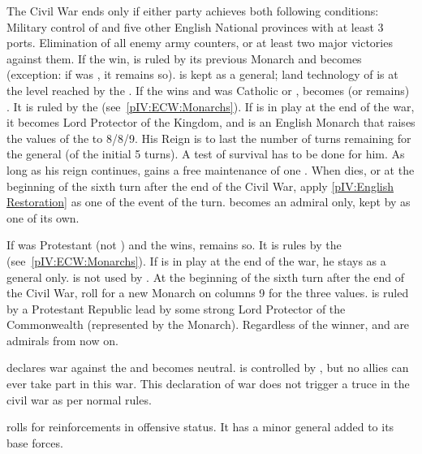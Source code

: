 \phpaix
\aparag The Civil War ends only if either party achieves both following
conditions:
\bparag Military control of  and five other English
National provinces with at least 3 ports.
\bparag Elimination of all enemy army counters, or at least two major
victories against them.
\aparag If the \royal win, \ENG is ruled by its previous Monarch and becomes
\CATHCR (exception: if \ENG was \CATHCO, it remains so). \leaderRupertroy is
kept as a general; land technology of \ENG is at the level reached by the
\royal.
\aparag If the \parl wins and \ENG was Catholic or \PROTANG, \ENG becomes (or
remains) \PROTANG.  It is ruled by the 
(see~\ref{pIV:ECW:Monarchs}).
\bparag If \leaderCromwell is in play at the end of the war, it becomes Lord
Protector of the Kingdom, and is an English Monarch that raises the values of
the  to 8/8/9. His Reign is to last the number of turns
remaining for the general (of the initial 5 turns).  A test of survival has to
be done for him. As long as his reign continues, \ENG gains a free maintenance
of one \ARMY\faceplus.
\bparag When \leaderCromwell dies, or at the beginning of the sixth turn after
the end of the Civil War, apply \ref{pIV:English Restoration} as one of the
event of the turn.
\bparag \leaderRupertang becomes an admiral only, kept by \ENG as one of its
own.

\aparag If \ENG was Protestant (not \PROTANG) and the \parl wins, \ENG remains
so. It is rules by the  (see~\ref{pIV:ECW:Monarchs}).
\bparag If \leaderCromwell is in play at the end of the war, he stays as a
general only. \leaderRupertang is not used by \ENG.
\bparag At the beginning of the sixth turn after the end of the Civil War,
roll for a new Monarch on columns 9 for the three values. \ENG is ruled by a
Protestant Republic lead by some strong Lord Protector of the Commonwealth
(represented by the Monarch).
\aparag Regardless of the winner, \leaderMonck and \leaderBlake are admirals
from now on.



\phevnt
\aparag \paysecosse declares war against the \royal and becomes neutral.
\paysecosse is controlled by \FRA, but no allies can ever take part in this
war. This declaration of war does not trigger a truce in the civil war as per
normal rules.

\phadm
\aparag \paysecosse rolls for reinforcements in offensive status.  It has a
minor general added to its base forces.

